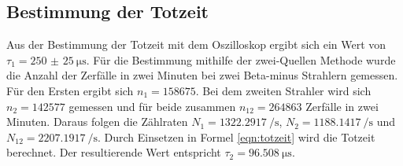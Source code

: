 \subsection{Bestimmung der Totzeit}
Aus der Bestimmung der Totzeit mit dem Oszilloskop ergibt sich ein Wert von $\tau_{1}=\qty{250(25)}{\micro\second}$.
Für die Bestimmung mithilfe der zwei-Quellen Methode wurde die Anzahl der Zerfälle in zwei Minuten bei zwei Beta-minus Strahlern gemessen.
Für den Ersten ergibt sich $n_1=158675$.
Bei dem zweiten Strahler wird sich $n_2=142577$ gemessen und für beide zusammen $n_{12}=264863$ Zerfälle in zwei Minuten.
Daraus folgen die Zählraten $N_1=\qty{1322.2917}{\per\second}$, $N_2=\qty{1188.1417}{\per\second}$ und $N_{12}=\qty{2207.1917}{\per\second}$.
Durch Einsetzen in Formel \ref{eqn:totzeit} wird die Totzeit berechnet.
Der resultierende Wert entspricht $\tau_{2}=\qty{96.508}{\micro\second}$.